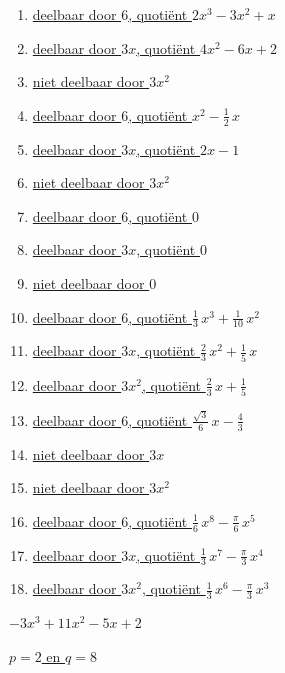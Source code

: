 \documentclass{ximera}
\begin{document}
\begin{Antwoord} \label{antw2.2}
\begin{enumerate}
\item
\hyperlink{oef2.2}{deelbaar door $6$, quotiënt $2x^3 - 3x^2 + x$} 
\item[]
\hyperlink{oef2.2}{deelbaar door $3x$, quotiënt $4x^2 - 6x + 2$} 
\item[]
\hyperlink{oef2.2}{niet deelbaar door $3x^2$}
\item
\hyperlink{oef2.2}{deelbaar door $6$, quotiënt $x^2 - \frac{1}{2}\,x$} 
\item[]
\hyperlink{oef2.2}{deelbaar door $3x$, quotiënt $2x-1$} 
\item[]
\hyperlink{oef2.2}{niet deelbaar door $3x^2$}
\item
\hyperlink{oef2.2}{deelbaar door $6$, quotiënt $0$} 
\item[]
\hyperlink{oef2.2}{deelbaar door $3x$, quotiënt $0$} 
\item[]
\hyperlink{oef2.2}{niet deelbaar door $0$}
\item
\hyperlink{oef2.2}{deelbaar door $6$, quotiënt $\frac{1}{3}\,x^3 + \frac{1}{10}\,x^2$} 
\item[]
\hyperlink{oef2.2}{deelbaar door $3x$, quotiënt $\frac{2}{3}\,x^2 + \frac{1}{5}\,x$} 
\item[]
\hyperlink{oef2.2}{deelbaar door $3x^2$, quotiënt $\frac{2}{3}\,x + \frac{1}{5}$}
\item
\hyperlink{oef2.2}{deelbaar door $6$, quotiënt $\frac{\sqrt{3}}{6}\,x - \frac{4}{3}$} 
\item[]
\hyperlink{oef2.2}{niet deelbaar door $3x$}
\item[]
\hyperlink{oef2.2}{niet deelbaar door $3x^2$}
\item
\hyperlink{oef2.2}{deelbaar door $6$, quotiënt $\frac{1}{6}\,x^8 - \frac{\pi}{6}\,x^5$} 
\item[]
\hyperlink{oef2.2}{deelbaar door $3x$, quotiënt $\frac{1}{3}\,x^7 - \frac{\pi}{3}\,x^4$} 
\item[]
\hyperlink{oef2.2}{deelbaar door $3x^2$, quotiënt $\frac{1}{3}\,x^6 - \frac{\pi}{3}\,x^3$}
\end{enumerate}
\end{Antwoord}

\begin{Antwoord} \label{antw2.3}
\hyperlink{oef2.3}{$-3x^3+11x^2-5x+2$}
\end{Antwoord}

\begin{Antwoord} \label{antw2.4}
\hyperlink{oef2.4}{$p=2$ en $q=8$}
\end{Antwoord}
\end{document}
